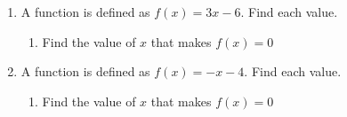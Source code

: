 \begin{enumerate}
\item A function is defined as $f(x)=3x-6$. Find each value.
  \begin{enumerate}
    \vspace{0.5cm}
    \item Find the value of $x$ that makes $f(x)=0$
  \end{enumerate} \vspace{2cm}

\item A function is defined as $f(x)=-x-4$. Find each value.
\begin{enumerate}
  \vspace{0.5cm}
  \item Find the value of $x$ that makes $f(x)=0$
\end{enumerate}

\end{enumerate}
